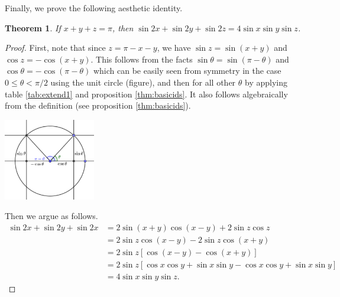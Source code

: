 \documentclass[a4paper,leqno]{article}
\numberwithin{equation}{section}
\newtheorem{thm}[equation]{Theorem}
\theoremstyle{definition}
\theoremstyle{remark}
\begin{document}
Finally, we prove the following aesthetic identity.
\begin{thm}
  If $ x + y + z = \pi $, then $ \sin 2x + \sin 2y + \sin 2z = 4\sin x \sin y \sin z $.
\end{thm}
\begin{proof}
  First, note that since $ z = \pi - x - y $, we have $ \sin z = \sin(x + y) $ and $ \cos z = -\cos(x + y) $. This follows
  from the facts $ \sin \theta = \sin(\pi - \theta) $ and $ \cos \theta = -\cos(\pi - \theta) $ which can be easily seen
  from symmetry in the case $ 0 \leq \theta < \pi/2 $ using the unit circle (figure), and then for all other $ \theta $ by
  applying table \ref{tab:extend1} and proposition \ref{thm:basicids}. It also follows algebraically from the definition
  (see proposition \ref{thm:basicids}).
  \begin{center}
    \includegraphics[width=0.3\textwidth]{piminus}
  \end{center}
  Then we argue as follows.
  \begin{align*}
    \sin 2x + \sin 2y + \sin 2x &= 2\sin(x + y)\cos(x - y) + 2\sin z \cos z\\
                                &= 2\sin z \cos(x - y) - 2\sin z \cos(x + y)\\
                                &= 2\sin z [\cos(x - y) - \cos(x + y)]\\
                                &= 2\sin z [\cos x \cos y + \sin x \sin y - \cos x \cos y + \sin x \sin y]\\
                                &= 4\sin x \sin y \sin z.
  \end{align*}
\end{proof}
\end{document}

